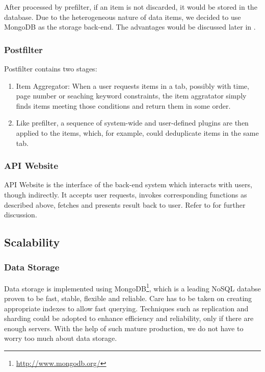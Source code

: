After processed by prefilter, if an item is not discarded, it would be
stored in the database. Due to the heterogeneous nature of data items,
we decided to use MongoDB as the storage back-end. The advantages would
be discussed later in .

\subsubsection{Postfilter}

Postfilter contains two stages:

\begin{enumerate}
\def\labelenumi{\arabic{enumi}.}
\itemsep1pt\parskip0pt
\item
  Item Aggregator: When a user requests items in a tab, possibly with
  time, page number or seaching keyword constraints, the item aggratator
  simply finds items meeting those conditions and return them in some
  order.
\item
  Like prefilter, a sequence of system-wide and user-defined plugins are
  then applied to the items, which, for example, could deduplicate items
  in the same tab.
\end{enumerate}

\subsubsection{API Website}

API Website is the interface of the back-end system which interacts with
users, though indirectly. It accepts user requests, invokes
corresponding functions as described above, fetches and presents result
back to user. Refer to  for further discussion.

\subsection{Scalability}

\subsubsection{Data Storage}
\label{sec:data}
Data storage is implemented using MongoDB\footnote{\url{http://www.mongodb.org/}},
which is a leading NoSQL databse proven to be fast, stable, flexible and reliable.
Care has to be taken on creating
appropriate indexes to allow fast querying. Techniques such as
replication and sharding could be adopted to enhance efficiency and
reliability, only if there are enough servers. With the help of such
mature production, we do not have to worry too much about data storage.

